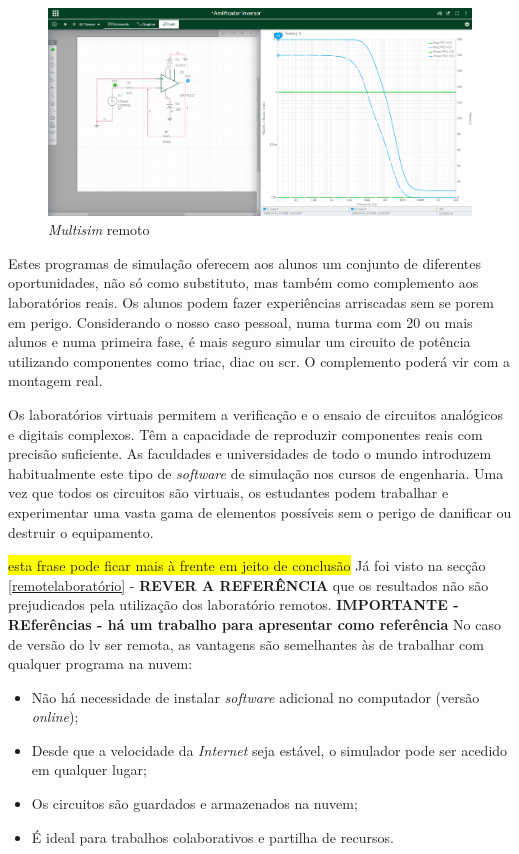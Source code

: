 \begin{figure}[hbtp]
\centering
    \includegraphics[width=0.9\linewidth]{figures/Multisim_ACsweep.png}
    \caption{\textit{Multisim} remoto}
    \label{fig:multisimlive}
\end{figure}

Estes programas de simulação oferecem aos alunos um conjunto de diferentes oportunidades, não só como substituto, mas também como complemento aos laboratórios reais\cite{WebBrowserSimulators}. Os alunos podem fazer experiências arriscadas sem se porem em perigo. Considerando o nosso caso pessoal, numa turma com 20 ou mais alunos e numa primeira fase, é mais seguro simular um circuito de potência utilizando componentes como \gls{triac}, \gls{diac} ou \gls{scr}. O complemento poderá vir com a montagem real.
 
 Os laboratórios virtuais permitem a verificação e o ensaio de circuitos analógicos e digitais complexos. Têm a capacidade de reproduzir componentes reais com precisão suficiente. As faculdades e universidades de todo o mundo introduzem habitualmente este tipo de \textit{software} de simulação nos cursos de engenharia. Uma vez que todos os circuitos são virtuais, os estudantes podem trabalhar e experimentar uma vasta gama de elementos possíveis sem o perigo de danificar ou destruir o equipamento.

\colorbox{yellow}{esta frase pode ficar mais à frente em jeito de conclusão}
Já foi visto na secção \ref{remotelaboratório} - \textbf{REVER A REFERÊNCIA} que os resultados não são prejudicados pela utilização dos \acrshort{laboratório remoto}s. \textbf{IMPORTANTE - REferências - há um trabalho para apresentar como referência}
No caso de versão do \acrshort{lv} ser remota, as vantagens são semelhantes às de trabalhar com qualquer programa na nuvem:

\begin{itemize}
    \item Não há necessidade de instalar \textit{software} adicional no computador (versão \textit{online});
    \item Desde que a velocidade da \textit{Internet} seja estável, o simulador pode ser acedido em qualquer lugar;
    \item Os circuitos são guardados e armazenados na nuvem;
    \item É ideal para trabalhos colaborativos e partilha de recursos.
\end{itemize}

